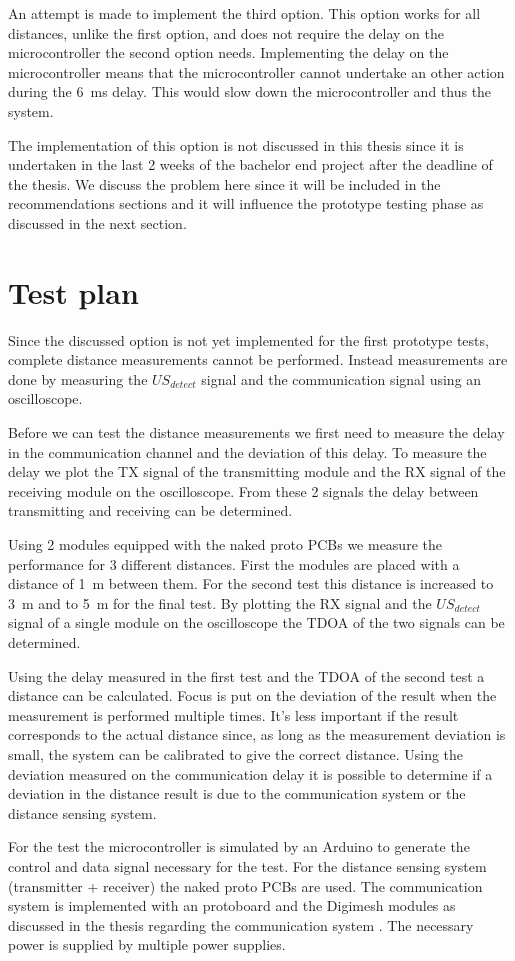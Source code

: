 An attempt is made to implement the third option.
This option works for all distances, unlike the first option, and does not require the delay on the microcontroller the second option needs.
Implementing the delay on the microcontroller means that the microcontroller cannot undertake an other action during the \SI{6}{\milli\second} delay.
This would slow down the microcontroller and thus the system.

The implementation of this option is not discussed in this thesis since it is undertaken in the last 2 weeks of the bachelor end project after the deadline of the thesis.
We discuss the problem here since it will be included in the recommendations sections and it will influence the prototype testing phase as discussed in the next section.

\section{Test plan}
\label{sec:testplan}
Since the discussed option is not yet implemented for the first prototype tests, complete distance measurements cannot be performed.
Instead measurements are done by measuring the $US_{detect}$ signal and the communication signal using an oscilloscope.

Before we can test the distance measurements we first need to measure the delay in the communication channel and the deviation of this delay.
To measure the delay we plot the TX signal of the transmitting module and the RX signal of the receiving module on the oscilloscope.
From these 2 signals the delay between transmitting and receiving can be determined.

Using 2 modules equipped with the naked proto PCBs we measure the performance for 3 different distances.
First the modules are placed with a distance of \SI{1}{\meter} between them.
For the second test this distance is increased to \SI{3}{\meter} and to \SI{5}{\meter} for the final test.
By plotting the RX signal and the $US_{detect}$ signal of a single module on the oscilloscope the TDOA of the two signals can be determined.

Using the delay measured in the first test and the TDOA of the second test a distance can be calculated.
Focus is put on the deviation of the result when the measurement is performed multiple times.
It's less important if the result corresponds to the actual distance since, as long as the measurement deviation is small, the system can be calibrated to give the correct distance.
Using the deviation measured on the communication delay it is possible to determine if a deviation in the distance result is due to the communication system or the distance sensing system.

For the test the microcontroller is simulated by an Arduino to generate the control and data signal necessary for the test.
For the distance sensing system (transmitter + receiver) the naked proto PCBs are used.
The communication system is implemented with an protoboard and the Digimesh modules as discussed in the thesis regarding the communication system \cite{communication}.
The necessary power is supplied by multiple power supplies.
